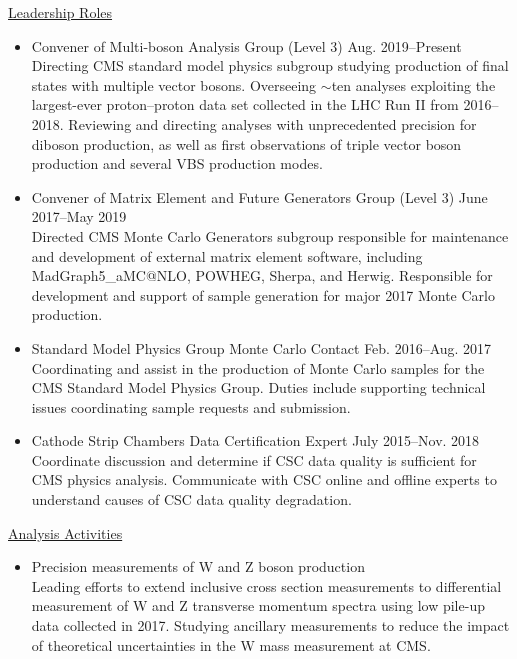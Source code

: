\documentclass[10pt]{res} %
\begin{document}
\begin{resume}
\underline{Leadership Roles}
\vspace{2mm}
\begin{itemize}
  \item{Convener of Multi-boson Analysis Group (Level 3) \hfill{Aug. 2019--Present}} \\
    Directing CMS standard model physics subgroup studying production of final states
    with multiple vector bosons. Overseeing $\sim$ten analyses exploiting the largest-ever
    proton--proton data set collected in the LHC Run II from 2016--2018. Reviewing and directing
    analyses with unprecedented precision for diboson production, 
    as well as first observations of triple vector boson production and several VBS production modes.
  \item{Convener of Matrix Element and Future Generators Group (Level 3) \hfill{June 2017--May 2019}} \\
    Directed CMS Monte Carlo Generators subgroup
    responsible for maintenance and development of external matrix element software, 
    including MadGraph5\_aMC@NLO, POWHEG, Sherpa, and Herwig. Responsible for development and support of sample generation for
    major 2017 Monte Carlo production.
  \item{Standard Model Physics Group Monte Carlo Contact \hfill{Feb. 2016--Aug. 2017}} \\
    Coordinating and assist 
    in the production of Monte Carlo samples for the CMS Standard Model Physics Group. 
    Duties include supporting technical issues coordinating sample requests and submission.
  \item{Cathode Strip Chambers Data Certification Expert \hfill{July 2015--Nov. 2018}} \\
    Coordinate discussion and determine if
    CSC data quality is sufficient for CMS physics analysis.
    Communicate with CSC online and offline experts to understand
    causes of CSC data quality degradation.
\end{itemize}

\underline{Analysis Activities}
\vspace{2mm}
\begin{itemize}
  \item{Precision measurements of W and Z boson production} \\
    Leading efforts to extend inclusive cross section measurements to differential 
    measurement of W and Z transverse momentum spectra using low pile-up data
    collected in 2017. Studying ancillary measurements
    to reduce the impact of theoretical uncertainties in the W mass measurement at CMS.
    

\end{itemize}
\end{resume}
\end{document}
